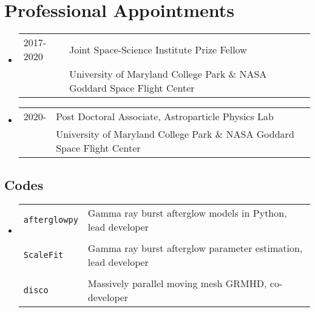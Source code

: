 \section*{Professional Appointments} %
\begin{itemize}
\item \begin{tabular}{ll}
2017-2020 & Joint Space-Science Institute Prize Fellow \\
	 & University of Maryland College Park \& NASA Goddard Space Flight Center\\
\end{tabular}
\item \begin{tabular}{ll}
2020- & Post Doctoral Associate, Astroparticle Physics Lab\\
	  & University of Maryland College Park \& NASA Goddard Space Flight Center\\
\end{tabular}
\end{itemize}


\subsection*{Codes}
\begin{itemize}
\item \begin{tabular}{ll}
\texttt{afterglowpy} & Gamma ray burst afterglow models in Python, lead developer\\
& \\
\texttt{ScaleFit} & Gamma ray burst afterglow parameter estimation, lead developer\\
& \\
\texttt{disco} & Massively parallel moving mesh GRMHD, co-developer
\end{tabular}
\end{itemize}

